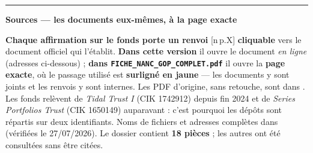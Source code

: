 \documentclass[9pt,a4paper]{extarticle}
\begin{document}
\vspace{2mm}\hrule\vspace{1.5mm}
{\color{bleu}\bfseries\large Sources --- les documents eux-mêmes, à la page exacte}\par\vspace{1mm}
{\scriptsize\color{grisf} \textbf{Chaque affirmation sur le fonds porte un renvoi} {\color{bleu}[n\,p.X]} \textbf{cliquable} vers le document officiel qui l'établit. \textbf{Dans cette version} il ouvre le document \emph{en ligne} (adresses ci-dessous) ; \textbf{dans \texttt{FICHE\_NANC\_GOP\_COMPLET.pdf}} il ouvre la \textbf{page exacte}, où le passage utilisé est \textbf{surligné en jaune} --- les documents y sont joints et les renvois y sont internes. Les PDF d'origine, sans retouche, sont dans . Les fonds relèvent de \emph{Tidal Trust I} (CIK 1742912) depuis fin 2024 et de \emph{Series Portfolios Trust} (CIK 1650149) auparavant : c'est pourquoi les dépôts sont répartis sur deux identifiants. Noms de fichiers et adresses complètes dans  (vérifiées le 27/07/2026). Le dossier contient \textbf{18 pièces} ; les autres ont été consultées sans être citées.\par}
\vspace{1mm}
\end{document}
